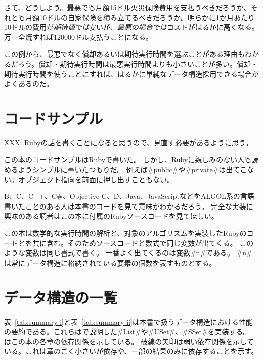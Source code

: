 さて、どうしよう。最悪でも月額15ドル火災保険費用を支払うべきだろうか、それとも月額10ドルの自家保険を積み立てるべきだろうか。明らかに1か月あたり10ドルの費用が\emph{期待値では}安いが、\emph{最悪の場合では}コストがはるかに高くなる。万一全焼すれば120000ドル支払うことになる。

この例から、最悪でなく償却あるいは期待実行時間を選ぶことがある理由もわかるだろう。償却・期待実行時間は最悪実行時間よりも小さいことが多い。償却・期待実行時間を使うことにすれば、はるかに単純なデータ構造採用できる場合がよくあるのだ。

\section{コードサンプル}
XXX: Rubyの話を書くことになると思うので、見直す必要があるように思う。

この本のコードサンプルはRubyで書いた。
しかし、Rubyに親しみのない人も読めるようシンプルに書いたつもりだ。
例えば#public#や#private#は出てこない。オブジェクト指向を前面に押し出すこともない。

B、C、C++、C\#、Objective-C、D、Java、JavaScriptなどをALGOL系の言語書いたことのある人は本書のコードを見て意味がわかるだろう。
完全な実装に興味のある読者はこの本に付属のRubyソースコードを見てほしい。

この本は数学的な実行時間の解析と、対象のアルゴリズムを実装したRubyのコードとを共に含む。そのためソースコードと数式で同じ変数が出てくる。
このような変数は同じ書式で書く。
一番よく出てくるのは変数#n#である。
#n#は常にデータ構造に格納されている要素の個数を表すものとする。

\section{データ構造の一覧}

表~\ref{tab:summary-i}と表~\ref{tab:summary-ii}は本書で扱うデータ構造における性能の要約である。これらはで説明した#List#や#USet#、#SSet#を実装する。
はこの本の各章の依存関係を示している。
%
破線の矢印は弱い依存関係を示している。これは章のごく小さいが依存や、一部の結果のみに依存することを示す。

